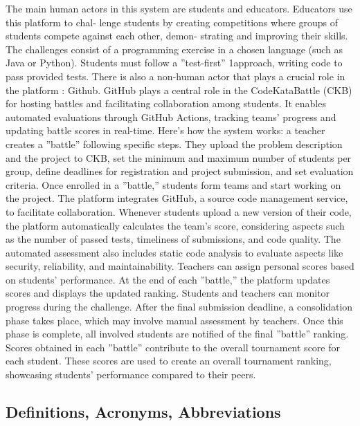     The main human actors in this system are students and educators. Educators use this platform to chal- lenge students by creating competitions where groups of students compete against each other, demon- strating and improving their skills. The challenges consist of a programming exercise in a chosen language (such as Java or Python). Students must follow a ”test-first” 1approach, writing code to pass provided tests.
There is also a non-human actor that plays a crucial role in the platform : Github. GitHub plays a central role in the CodeKataBattle (CKB) for hosting battles and facilitating collaboration among students. It
enables automated evaluations through GitHub Actions, tracking teams’ progress and updating battle scores in real-time.
Here’s how the system works: a teacher creates a ”battle” following specific steps. They upload the problem description and the project to CKB, set the minimum and maximum number of students per group, define deadlines for registration and project submission, and set evaluation criteria. Once enrolled in a ”battle,” students form teams and start working on the project. The platform integrates GitHub, a source code management service, to facilitate collaboration.
Whenever students upload a new version of their code, the platform automatically calculates the team’s score, considering aspects such as the number of passed tests, timeliness of submissions, and code quality. The automated assessment also includes static code analysis to evaluate aspects like security, reliability, and maintainability. Teachers can assign personal scores based on students’ performance.
At the end of each ”battle,” the platform updates scores and displays the updated ranking. Students and teachers can monitor progress during the challenge. After the final submission deadline, a consolidation phase takes place, which may involve manual assessment by teachers. Once this phase is complete, all involved students are notified of the final ”battle” ranking.
Scores obtained in each ”battle” contribute to the overall tournament score for each student. These scores are used to create an overall tournament ranking, showcasing students’ performance compared to their peers.

\newpage


\subsection{Definitions, Acronyms, Abbreviations}
